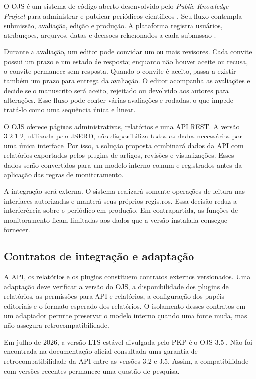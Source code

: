 O OJS é um sistema de código aberto desenvolvido pelo \textit{Public Knowledge Project} para administrar e publicar periódicos científicos \cite{willinsky2005ojs}. Seu fluxo contempla submissão, avaliação, edição e produção. A plataforma registra usuários, atribuições, arquivos, datas e decisões relacionados a cada submissão \cite{pkp2022learning}.

Durante a avaliação, um editor pode convidar um ou mais revisores. Cada convite possui um prazo e um estado de resposta; enquanto não houver aceite ou recusa, o convite permanece sem resposta. Quando o convite é aceito, passa a existir também um prazo para entrega da avaliação. O editor acompanha as avaliações e decide se o manuscrito será aceito, rejeitado ou devolvido aos autores para alterações. Esse fluxo pode conter várias avaliações e rodadas, o que impede tratá-lo como uma sequência única e linear.

O OJS oferece páginas administrativas, relatórios e uma API REST. A versão 3.2.1.2, utilizada pelo JSERD, não disponibiliza todos os dados necessários por uma única interface. Por isso, a solução proposta combinará dados da API com relatórios exportados pelos plugins de artigos, revisões e visualizações. Esses dados serão convertidos para um modelo interno comum e registrados antes da aplicação das regras de monitoramento.

A integração será externa. O sistema realizará somente operações de leitura nas interfaces autorizadas e manterá seus próprios registros. Essa decisão reduz a interferência sobre o periódico em produção. Em contrapartida, as funções de monitoramento ficam limitadas aos dados que a versão instalada consegue fornecer.

\subsection{Contratos de integração e adaptação}
\label{sec-fundteo-adaptacao}

A API, os relatórios e os plugins constituem contratos externos versionados. Uma adaptação deve verificar a versão do OJS, a disponibilidade dos plugins de relatórios, as permissões para API e relatórios, a configuração dos papéis editoriais e o formato esperado dos relatórios. O isolamento desses contratos em um adaptador permite preservar o modelo interno quando uma fonte muda, mas não assegura retrocompatibilidade.

Em julho de 2026, a versão LTS estável divulgada pelo PKP é o OJS 3.5 \cite{pkp2026download}. Não foi encontrada na documentação oficial consultada uma garantia de retrocompatibilidade da API entre as versões 3.2 e 3.5. Assim, a compatibilidade com versões recentes permanece uma questão de pesquisa.

